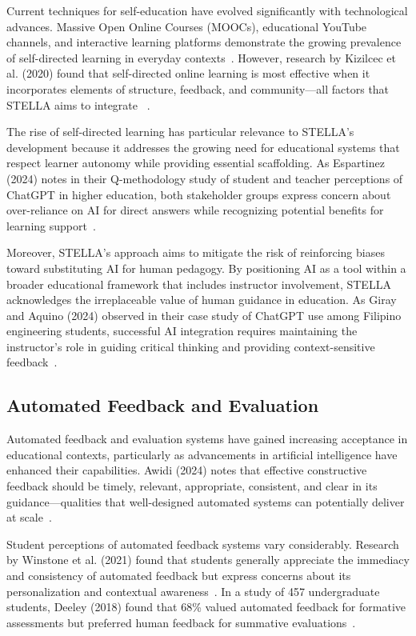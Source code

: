 \documentclass[sigconf,natbib=true]{acmart}
\begin{document}
Current techniques for self-education have evolved significantly with technological advances. Massive Open Online Courses (MOOCs), educational YouTube channels, and interactive learning platforms demonstrate the growing prevalence of self-directed learning in everyday contexts~\cite{boudSustainableAssessmentRevisited2016}. However, research by Kizilcec et al. (2020) found that self-directed online learning is most effective when it incorporates elements of structure, feedback, and community—all factors that STELLA aims to integrate ~\cite{kizilcecScalingBehavioralScience2020}.

The rise of self-directed learning has particular relevance to STELLA's development because it addresses the growing need for educational systems that respect learner autonomy while providing essential scaffolding. As Espartinez (2024) notes in their Q-methodology study of student and teacher perceptions of ChatGPT in higher education, both stakeholder groups express concern about over-reliance on AI for direct answers while recognizing potential benefits for learning support~\cite{espartinezExploringStudentTeacher2024}.

Moreover, STELLA's approach aims to mitigate the risk of reinforcing biases toward substituting AI for human pedagogy. By positioning AI as a tool within a broader educational framework that includes instructor involvement, STELLA acknowledges the irreplaceable value of human guidance in education. As Giray and Aquino (2024) observed in their case study of ChatGPT use among Filipino engineering students, successful AI integration requires maintaining the instructor's role in guiding critical thinking and providing context-sensitive feedback~\cite{girayUseImpactChatGPT2024}.

\subsection{Automated Feedback and Evaluation}
Automated feedback and evaluation systems have gained increasing acceptance in educational contexts, particularly as advancements in artificial intelligence have enhanced their capabilities. Awidi (2024) notes that effective constructive feedback should be timely, relevant, appropriate, consistent, and clear in its guidance—qualities that well-designed automated systems can potentially deliver at scale~\cite{awidiComparingExpertTutor2024}.

Student perceptions of automated feedback systems vary considerably. Research by Winstone et al. (2021) found that students generally appreciate the immediacy and consistency of automated feedback but express concerns about its personalization and contextual awareness~\cite{winstoneDesigningEffectiveFeedback2019}. In a study of 457 undergraduate students, Deeley (2018) found that 68\% valued automated feedback for formative assessments but preferred human feedback for summative evaluations~\cite{deeleyUsingTechnologyFacilitate2018}.
\end{document}
